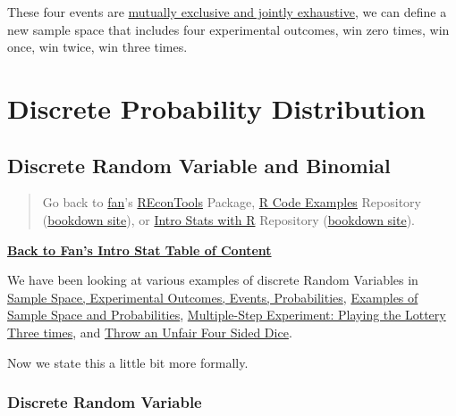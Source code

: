 \documentclass[
]{book}
\begin{document}
These four events are \href{https://fanwangecon.github.io/Stat4Econ/probability/htmlpdfr/samplespace.html}{mutually exclusive and jointly exhaustive}, we can define a new sample space that includes four experimental outcomes, win zero times, win once, win twice, win three times.

\hypertarget{discrete-probability-distribution}{%
\chapter{Discrete Probability Distribution}\label{discrete-probability-distribution}}

\hypertarget{discrete-random-variable-and-binomial}{%
\section{Discrete Random Variable and Binomial}\label{discrete-random-variable-and-binomial}}

\begin{quote}
Go back to \href{http://fanwangecon.github.io/}{fan}'s \href{https://fanwangecon.github.io/REconTools/}{REconTools} Package, \href{https://fanwangecon.github.io/R4Econ/}{R Code Examples} Repository (\href{https://fanwangecon.github.io/R4Econ/bookdown}{bookdown site}), or \href{https://fanwangecon.github.io/Stat4Econ/}{Intro Stats with R} Repository (\href{https://fanwangecon.github.io/Stat4Econ/bookdown}{bookdown site}).
\end{quote}

\textbf{\href{https://fanwangecon.github.io/Stat4Econ/}{Back to Fan's Intro Stat Table of Content}}

We have been looking at various examples of discrete Random Variables in \href{https://fanwangecon.github.io/Stat4Econ/probability/htmlpdfr/samplespace.html}{Sample Space, Experimental Outcomes, Events, Probabilities}, \href{https://fanwangecon.github.io/Stat4Econ/probability/htmlpdfr/samplespaceexa.html}{Examples of Sample Space and Probabilities}, \href{https://fanwangecon.github.io/Stat4Econ/probability/htmlpdfr/lottery.html}{Multiple-Step Experiment: Playing the Lottery Three times}, and \href{https://fanwangecon.github.io/Stat4Econ/probability/htmlpdfr/samplespacedice.html}{Throw an Unfair Four Sided Dice}.

Now we state this a little bit more formally.

\hypertarget{discrete-random-variable}{%
\subsection{Discrete Random Variable}\label{discrete-random-variable}}
\end{document}
